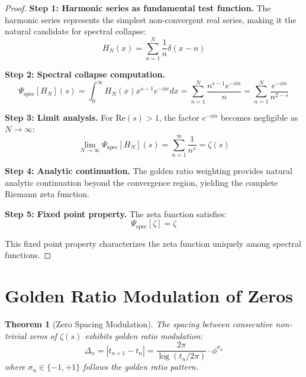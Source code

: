 \documentclass[12pt]{article}
\theoremstyle{plain}
\newtheorem{theorem}{Theorem}[section]
\theoremstyle{definition}
\begin{document}
\begin{proof}
\textbf{Step 1: Harmonic series as fundamental test function.}
The harmonic series represents the simplest non-convergent real series, making it the natural candidate for spectral collapse:
$$H_N(x) = \sum_{n=1}^N \frac{1}{n} \delta(x-n)$$

\textbf{Step 2: Spectral collapse computation.}
$$\Psi_{\text{spec}}[H_N](s) = \int_0^{\infty} H_N(x) x^{s-1} e^{-\phi x} dx = \sum_{n=1}^N \frac{n^{s-1} e^{-\phi n}}{n} = \sum_{n=1}^N \frac{e^{-\phi n}}{n^{2-s}}$$

\textbf{Step 3: Limit analysis.}
For $\text{Re}(s) > 1$, the factor $e^{-\phi n}$ becomes negligible as $N \to \infty$:
$$\lim_{N \to \infty} \Psi_{\text{spec}}[H_N](s) = \sum_{n=1}^{\infty} \frac{1}{n^s} = \zeta(s)$$

\textbf{Step 4: Analytic continuation.}
The golden ratio weighting provides natural analytic continuation beyond the convergence region, yielding the complete Riemann zeta function.

\textbf{Step 5: Fixed point property.}
The zeta function satisfies:
$$\Psi_{\text{spec}}[\zeta] = \zeta$$

This fixed point property characterizes the zeta function uniquely among spectral functions.
\end{proof}

\section{Golden Ratio Modulation of Zeros}

\begin{theorem}[Zero Spacing Modulation]
\label{thm:zero-modulation}
The spacing between consecutive non-trivial zeros of $\zeta(s)$ exhibits golden ratio modulation:
$$\Delta_n = |t_{n+1} - t_n| = \frac{2\pi}{\log(t_n/2\pi)} \cdot \phi^{\sigma_n}$$
where $\sigma_n \in \{-1, +1\}$ follows the golden ratio pattern.
\end{theorem}
\end{document}
